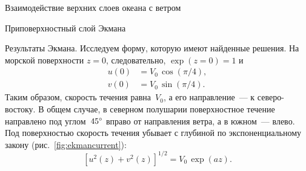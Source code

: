 \begin{chapter}{Взаимодействие верхних слоев океана с ветром}
\begin{section}{Приповерхностный слой Экмана}
\begin{paragraph}{Результаты Экмана.}
Исследуем форму, которую имеют найденные решения. На морской 
поверхности $z = 0$, следовательно, $\exp(z=0) = 1$ и
\begin{subequations}
\begin{align}
u(0) &= V_0\, \cos(\pi/4),  \\
v(0) &= V_0\, \sin(\pi/4).
\end{align}
\end{subequations}
Таким образом, скорость течения равна~$V_0$, а его направление~--- 
к северо-востоку. В общем случае, в северном полушарии поверхностное течение 
направлено под углом~${45}^\circ$ вправо от направления ветра, 
а в южном~--- влево. Под поверхностью скорость течения убывает с глубиной
по экспоненциальному закону (рис.~\ref{fig:ekmancurrent}):
\begin{equation}
 \left[u^2(z) + v^2(z) \right]^{1/2} =V_0\,\exp(az).
\end{equation}
%


\end{paragraph}
\end{section}
\end{chapter}
